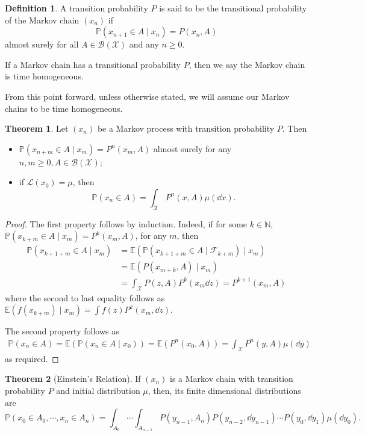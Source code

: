 \documentclass[]{article}
\theoremstyle{definition}
\newtheorem{theorem}{Theorem}
\theoremstyle{definition}
\newtheorem{definition}{Definition}[section]
\begin{document}
\begin{definition}
  A transition probability \(P\) is said to  be the transitional probability of 
  the Markov chain \((x_n)\) if 
  \[\mathbb{P}(x_{n + 1} \in A \mid x_n) = P(x_n, A)\]
  almost surely for all \(A \in \mathcal{B}(\mathcal{X})\) and any \(n \ge 0\).

  If a Markov chain has a transitional probability \(P\), then we say the Markov 
  chain is time homogeneous.
\end{definition}

From this point forward, unless otherwise stated, we will assume our Markov chains 
to be time homogeneous.

\begin{theorem}
  Let \((x_n)\) be a Markov process with transition probability \(P\). Then 
  \begin{itemize}
    \item \(\mathbb{P}(x_{n + m} \in A \mid x_m) = P^n(x_m, A)\) almost surely for any 
      \(n, m \ge 0, A \in \mathcal{B}(\mathcal{X})\);
    \item if \(\mathcal{L}(x_0) = \mu\), then 
      \[\mathbb{P}(x_n \in A) = \int_{\mathcal{X}} P^n(x, A) \mu(\dd x).\] 
  \end{itemize}
\end{theorem}
\begin{proof}
  The first property follows by induction. Indeed, if
  for some \(k \in \mathbb{N}\), \(\mathbb{P}(x_{k + m} \in A \mid x_m) = P^k(x_m, A)\), 
  for any \(m\), then 
  \[\begin{split}
    \mathbb{P}(x_{k + 1 + m} \in A \mid x_m) 
    & = \mathbb{E}(\mathbb{P}(x_{k + 1 + m} \in A \mid \mathcal{F}_{k + m}) \mid x_m) \\
    & = \mathbb{E}(P(x_{m + k}, A) \mid x_m) \\
    & = \int_{\mathcal{X}}P(z, A) P^k(x_m \dd z) = P^{k + 1}(x_m, A)
  \end{split}\]
  where the second to last equality follows as \(\mathbb{E}(f(x_{k + m}) \mid x_m) = 
  \int f(z) P^k(x_m, \dd z)\).

  The second property follows as 
  \[\begin{split}
    \mathbb{P}(x_n \in A) = \mathbb{E}(\mathbb{P}(x_n \in A \mid x_0)) 
    = \mathbb{E}(P^n(x_0, A)) = \int_{\mathcal{X}}P^n(y, A) \mu(\dd y)
  \end{split}\]
  as required.
\end{proof}

\begin{theorem}[Einstein's Relation]
  If \((x_n)\) is a Markov chain with transition probability \(P\) and initial 
  distribution \(\mu\), then, its finite dimensional distributions are 
  \[\mathbb{P}(x_0 \in A_0, \cdots, x_n \in A_n) = 
    \int_{A_0} \cdots \int_{A_{n - 1}} P(y_{n - 1}, A_n) P(y_{n - 2}, \dd y_{n - 1}) \cdots P(y_0, \dd y_1) \mu(\dd y_0).\]
\end{theorem}
\end{document}
